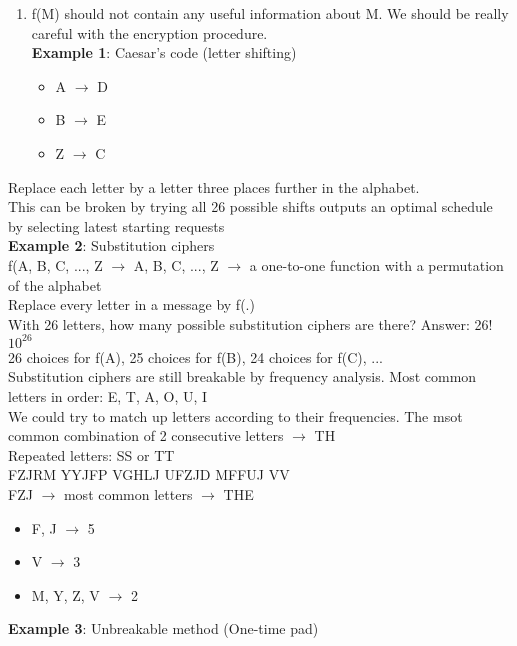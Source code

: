 \documentclass[9pt, letterpaper, oneside]{article}
\begin{document}
\begin{enumerate}
    \item f(M) should not contain any useful information about M. We should be really careful with the encryption procedure.\\
    \textbf{Example 1}: Caesar's code (letter shifting)\\
    \begin{itemize}
        \item A $\to$ D
        \item B $\to$ E
        \item Z $\to$ C
    \end{itemize}
 \end{enumerate}%
    Replace each letter by a letter three places further in the alphabet.\\
    This can be broken by trying all 26 possible shifts outputs an optimal schedule by selecting latest starting requests\\
    \textbf{Example 2}: Substitution ciphers\\
    f({A, B, C, ..., Z} $\to$ {A, B, C, ..., Z} $\to$ a one-to-one function with a permutation of the alphabet\\
    Replace every letter in a message by f(.)\\
    With 26 letters, how many possible substitution ciphers are there? Answer: 26! ~ $10^{26}$\\
    26 choices for f(A), 25 choices for f(B), 24 choices for f(C), ...\\
    Substitution ciphers are still breakable by frequency analysis. Most common letters in order: E, T, A, O, U, I\\
    We could try to match up letters according to their frequencies. The msot common combination of 2 consecutive letters $\to$ TH\\
    Repeated letters: SS or TT\\
    FZJRM YYJFP VGHLJ UFZJD MFFUJ VV\\
    FZJ $\to$ most common letters $\to$ THE\\
    \begin{itemize}
        \item F, J $\to$ 5
        \item V $\to$ 3
        \item M, Y, Z, V $\to$ 2
    \end{itemize}
    \textbf{Example 3}: Unbreakable method (One-time pad)\\
\end{document}
